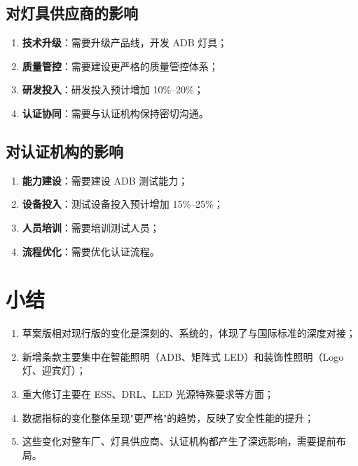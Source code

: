 \subsection{对灯具供应商的影响}

\begin{enumerate}[leftmargin=2em]
    \item \textbf{技术升级}：需要升级产品线，开发 ADB 灯具；
    \item \textbf{质量管控}：需要建设更严格的质量管控体系；
    \item \textbf{研发投入}：研发投入预计增加 10\%--20\%；
    \item \textbf{认证协同}：需要与认证机构保持密切沟通。
\end{enumerate}

\subsection{对认证机构的影响}

\begin{enumerate}[leftmargin=2em]
    \item \textbf{能力建设}：需要建设 ADB 测试能力；
    \item \textbf{设备投入}：测试设备投入预计增加 15\%--25\%；
    \item \textbf{人员培训}：需要培训测试人员；
    \item \textbf{流程优化}：需要优化认证流程。
\end{enumerate}

\section{小结}

\begin{enumerate}[leftmargin=2em]
    \item 草案版相对现行版的变化是深刻的、系统的，体现了与国际标准的深度对接；
    \item 新增条款主要集中在智能照明（ADB、矩阵式 LED）和装饰性照明（Logo 灯、迎宾灯）；
    \item 重大修订主要在 ESS、DRL、LED 光源特殊要求等方面；
    \item 数据指标的变化整体呈现"更严格"的趋势，反映了安全性能的提升；
    \item 这些变化对整车厂、灯具供应商、认证机构都产生了深远影响，需要提前布局。
\end{enumerate}